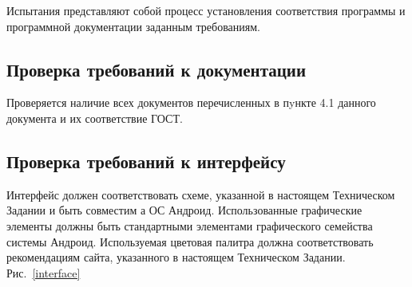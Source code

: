 Испытания представляют собой процесс установления соответствия программы и
программной документации заданным требованиям.

\subsection{Проверка требований к документации}
Проверяется наличие всех документов перечисленных в пyнкте 4.1 данного
документа и их соответствие ГОСТ.

\subsection{Проверка требований к интерфейсу}
Интерфейс должен соответствовать схеме, указанной в настоящем Техническом
Задании и быть совместим а ОС Андроид. Использованные графические элементы
должны быть стандартными элементами графического семейства системы Андроид.
Используемая цветовая палитра должна соответствовать рекомендациям сайта,
указанного в настоящем Техническом Задании. Рис.~\ref{interface}

